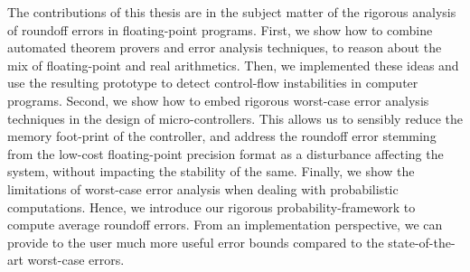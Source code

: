 The contributions of this thesis are in the subject matter of the rigorous analysis of roundoff errors in floating-point programs.
%
First, we show how to combine automated theorem provers and error analysis techniques, to reason about the mix of floating-point and real arithmetics.
%
Then, we implemented these ideas and use the resulting prototype to detect control-flow instabilities in computer programs.
%
Second, we show how to embed rigorous worst-case error analysis techniques in the design of micro-controllers.
%
This allows us to sensibly reduce the memory foot-print of the controller, and address the roundoff error stemming from the low-cost floating-point precision format as a disturbance affecting the system, without impacting the stability of the same.
%
%
Finally, we show the limitations of worst-case error analysis when dealing with probabilistic computations. 
%
Hence, we introduce our rigorous probability-framework to compute average roundoff errors.
%
From an implementation perspective, we can provide to the user much more useful error bounds compared to the state-of-the-art worst-case errors.